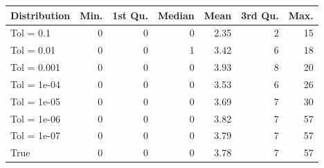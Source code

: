 \begin{figure} 
\begin{tabular}{lrrrrrr}
 Distribution & Min. & 1st Qu. & Median & Mean & 3rd Qu. & Max. \\ 
  \hline
\hline
Tol =  0.1 & 0 & 0 & 0 & 2.35 & 2 & 15 \\ 
  Tol =  0.01 & 0 & 0 & 1 & 3.42 & 6 & 18 \\ 
  Tol =  0.001 & 0 & 0 & 0 & 3.93 & 8 & 20 \\ 
  Tol =  1e-04 & 0 & 0 & 0 & 3.53 & 6 & 26 \\ 
  Tol =  1e-05 & 0 & 0 & 0 & 3.69 & 7 & 30 \\ 
  Tol =  1e-06 & 0 & 0 & 0 & 3.82 & 7 & 57 \\ 
  Tol =  1e-07 & 0 & 0 & 0 & 3.79 & 7 & 57 \\ 
  True & 0 & 0 & 0 & 3.78 & 7 & 57 \\ 
  \end{tabular}
\label{tab:SummaryTable}
\end{figure} 
